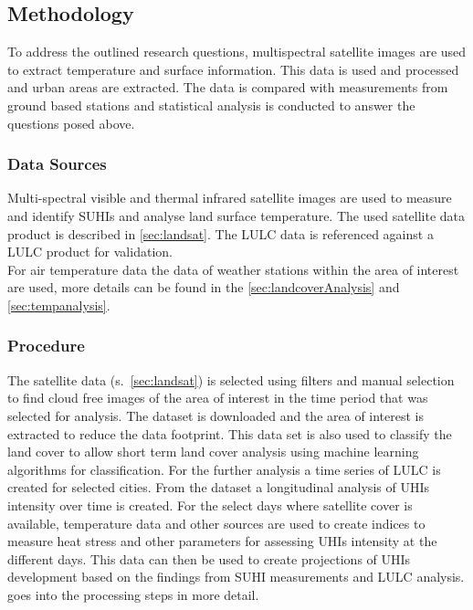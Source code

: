 \documentclass[12pt,a4paper, english,twoside]{scrartcl}
\begin{document}
 \subsection{Methodology}\label{sec:methodology}
  To address the outlined research questions, multispectral satellite images are used to extract temperature and surface information. 
  This data is used and processed and urban areas are extracted. 
  The data is compared with measurements from ground based stations and statistical analysis is conducted to answer the questions posed above.

  \subsubsection{Data Sources}\label{ssec:datasources} 
    Multi-spectral visible and thermal infrared satellite images are used to measure and identify \glspl{SUHI} and analyse land surface temperature.
    The used satellite data product is described in \cref{sec:landsat}.
    The \gls{LULC} data is referenced against a \gls{LULC} product for validation.\\ 
    For air temperature data the data of weather stations within the area of interest are used, more details can be found in the \cref{sec:landcoverAnalysis} and \cref{sec:tempanalysis}. 

  \subsubsection{Procedure}\label{ssec:procedure} 
    The satellite data (s.~\cref{sec:landsat}) is selected using filters and manual selection to find cloud free images of the area of interest in the time period that was selected for analysis. 
    The dataset is downloaded and the area of interest is extracted to reduce the data footprint.
    This data set is also used to classify the land cover to allow short term land cover analysis using machine learning algorithms for classification.
    For the further analysis a time series of \gls{LULC} is created for selected cities. 
    From the dataset a longitudinal analysis of \glspl{UHI} intensity over time is created.
    For the select days where satellite cover is available, temperature data and other sources are used to create indices to measure heat stress and other parameters for assessing \glspl{UHI} intensity at the different days.
    This data can then be used to create projections of \glspl{UHI} development based on the findings from \gls{SUHI} measurements and \gls{LULC} analysis.
     goes into the processing steps in more detail.
\end{document}
